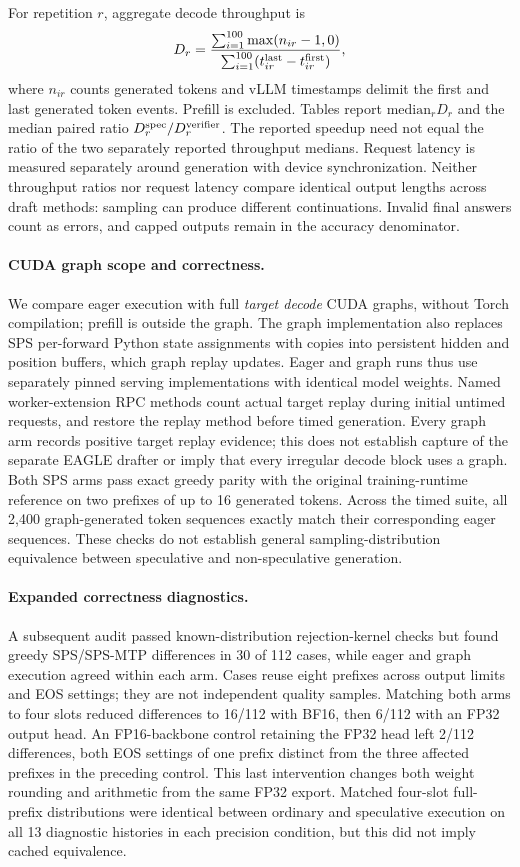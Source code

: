For repetition $r$, aggregate decode throughput is
\[
D_r=\frac{\sum_{i=1}^{100}\max(n_{ir}-1,0)}{\sum_{i=1}^{100}(t^{\rm last}_{ir}-t^{\rm first}_{ir})},
\]
where $n_{ir}$ counts generated tokens and vLLM timestamps delimit the first and last generated token events. Prefill is excluded. Tables report $\mathrm{median}_r D_r$ and the median paired ratio $D^{\rm spec}_r/D^{\rm verifier}_r$. The reported speedup need not equal the ratio of the two separately reported throughput medians. Request latency is measured separately around generation with device synchronization. Neither throughput ratios nor request latency compare identical output lengths across draft methods: sampling can produce different continuations. Invalid final answers count as errors, and capped outputs remain in the accuracy denominator.

\paragraph{CUDA graph scope and correctness.}
We compare eager execution with full \emph{target decode} CUDA graphs, without Torch compilation; prefill is outside the graph. The graph implementation also replaces SPS per-forward Python state assignments with copies into persistent hidden and position buffers, which graph replay updates. Eager and graph runs thus use separately pinned serving implementations with identical model weights. Named worker-extension RPC methods count actual target replay during initial untimed requests, and restore the replay method before timed generation. Every graph arm records positive target replay evidence; this does not establish capture of the separate EAGLE drafter or imply that every irregular decode block uses a graph. Both SPS arms pass exact greedy parity with the original training-runtime reference on two prefixes of up to 16 generated tokens. Across the timed suite, all 2,400 graph-generated token sequences exactly match their corresponding eager sequences. These checks do not establish general sampling-distribution equivalence between speculative and non-speculative generation.

\paragraph{Expanded correctness diagnostics.}
A subsequent audit passed known-distribution rejection-kernel checks but found greedy SPS/SPS-MTP differences in 30 of 112 cases, while eager and graph execution agreed within each arm. Cases reuse eight prefixes across output limits and EOS settings; they are not independent quality samples. Matching both arms to four slots reduced differences to 16/112 with BF16, then 6/112 with an FP32 output head. An FP16-backbone control retaining the FP32 head left 2/112 differences, both EOS settings of one prefix distinct from the three affected prefixes in the preceding control. This last intervention changes both weight rounding and arithmetic from the same FP32 export. Matched four-slot full-prefix distributions were identical between ordinary and speculative execution on all 13 diagnostic histories in each precision condition, but this did not imply cached equivalence.

